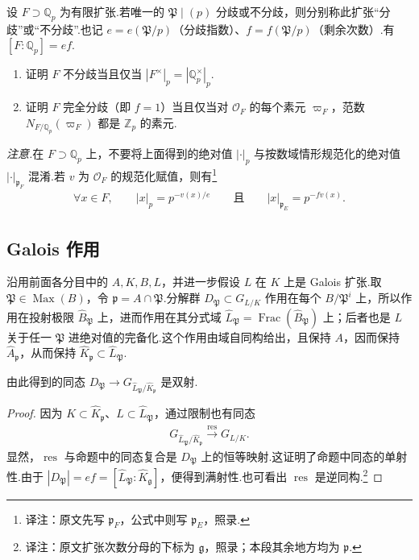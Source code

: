 \begin{exercise*}
设 $F\supset\mathbb Q_p$ 为有限扩张.若唯一的 $\mathfrak P\mid(p)$ 分歧或不分歧，则分别称此扩张``分歧''或``不分歧''.也记 $e=e(\mathfrak P/p)$（分歧指数）、$f=f(\mathfrak P/p)$（剩余次数）.有 $[F:\mathbb Q_p]=ef$.
\begin{enumerate}[label=\roman*)]
\item 证明 $F$ 不分歧当且仅当 $|F^\times|_p=|\mathbb Q_p^\times|_p$.
\item 证明 $F$ 完全分歧（即 $f=1$）当且仅当对 $\mathcal O_F$ 的每个素元 $\varpi_F$，范数 $N_{F/\mathbb Q_p}(\varpi_F)$ 都是 $\mathbb Z_p$ 的素元.
\end{enumerate}
\end{exercise*}
\emph{注意.}在 $F\supset\mathbb Q_p$ 上，不要将上面得到的绝对值 $|\cdot|_p$ 与按数域情形规范化的绝对值 $|\cdot|_{\mathfrak p_F}$ 混淆.若 $v$ 为 $\mathcal O_F$ 的规范化赋值，则有\footnote{译注：原文先写 $\mathfrak p_F$，公式中则写 $\mathfrak p_E$，照录.}
\begin{align*}
\forall x\in F,\qquad |x|_p=p^{-v(x)/e}
\qquad\text{且}\qquad |x|_{\mathfrak p_E}=p^{-fv(x)}.
\end{align*}
\subsection{Galois 作用}\label{sec:nt-4-2-6}
沿用前面各分目中的 $A,K,B,L$，并进一步假设 $L$ 在 $K$ 上是 Galois 扩张.取 $\mathfrak P\in\operatorname{Max}(B)$，令 $\mathfrak p=A\cap\mathfrak P$.分解群 $D_{\mathfrak P}\subset G_{L/K}$ 作用在每个 $B/\mathfrak P^i$ 上，所以作用在投射极限 $\widehat B_{\mathfrak P}$ 上，进而作用在其分式域 $\widehat L_{\mathfrak P}=\operatorname{Frac}(\widehat B_{\mathfrak P})$ 上；后者也是 $L$ 关于任一 $\mathfrak P$ 进绝对值的完备化.这个作用由域自同构给出，且保持 $A$，因而保持 $\widehat A_{\mathfrak p}$，从而保持 $\widehat K_{\mathfrak p}\subset\widehat L_{\mathfrak P}$.
\begin{proposition*}
由此得到的同态 $D_{\mathfrak P}\longrightarrow G_{\widehat L_{\mathfrak P}/\widehat K_{\mathfrak p}}$ 是双射.
\end{proposition*}
\begin{proof}
因为 $K\subset\widehat K_{\mathfrak p}$、$L\subset\widehat L_{\mathfrak P}$，通过限制也有同态
\begin{align*}
G_{\widehat L_{\mathfrak P}/\widehat K_{\mathfrak p}}
\xrightarrow{\operatorname{res}}G_{L/K}.
\end{align*}
显然，$\operatorname{res}$ 与命题中的同态复合是 $D_{\mathfrak P}$ 上的恒等映射.这证明了命题中同态的单射性.由于 $|D_{\mathfrak P}|=ef=[\widehat L_{\mathfrak P}:\widehat K_{\mathfrak g}]$，便得到满射性.也可看出 $\operatorname{res}$ 是逆同构.\footnote{译注：原文扩张次数分母的下标为 $\mathfrak g$，照录；本段其余地方均为 $\mathfrak p$.}
\end{proof}
